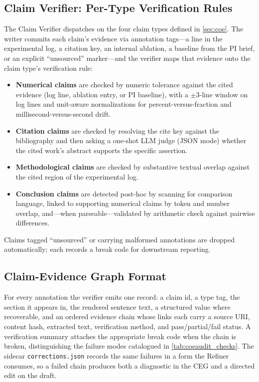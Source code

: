 \subsection{Claim Verifier: Per-Type Verification Rules}
\label{app:claim_verifier_rules}

The Claim Verifier dispatches on the four claim types defined in \cref{sec:coe}.
The writer commits each claim's evidence via annotation tags---a line in the experimental log, a citation key, an internal ablation, a baseline from the PI brief, or an explicit ``unsourced'' marker---and the verifier maps that evidence onto the claim type's verification rule:

\begin{itemize}\itemsep2pt \parskip0pt
  \item \textbf{Numerical claims} are checked by numeric tolerance against the cited evidence (log line, ablation entry, or PI baseline), with a $\pm 3$-line window on log lines and unit-aware normalizations for percent-versus-fraction and millisecond-versus-second drift.
  \item \textbf{Citation claims} are checked by resolving the cite key against the bibliography and then asking a one-shot LLM judge (JSON mode) whether the cited work's abstract supports the specific assertion.
  \item \textbf{Methodological claims} are checked by substantive textual overlap against the cited region of the experimental log.
  \item \textbf{Conclusion claims} are detected post-hoc by scanning for comparison language, linked to supporting numerical claims by token and number overlap, and---when parseable---validated by arithmetic check against pairwise differences.
\end{itemize}

\noindent Claims tagged ``unsourced'' or carrying malformed annotations are dropped automatically; each records a break code for downstream reporting.

\subsection{Claim-Evidence Graph Format}

For every annotation the verifier emits one record: a claim id, a type tag, the section it appears in, the rendered sentence text, a structured value where recoverable, and an ordered evidence chain whose links each carry a source URI, content hash, extracted text, verification method, and pass/partial/fail status.
A verification summary attaches the appropriate break code when the chain is broken, distinguishing the failure modes catalogued in \cref{tab:coeaudit_checks}.
The sidecar \texttt{corrections.json} records the same failures in a form the Refiner consumes, so a failed chain produces both a diagnostic in the CEG and a directed edit on the draft.

